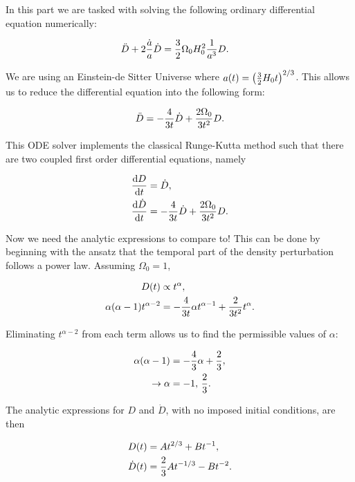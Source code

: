 In this part we are tasked with solving the following ordinary differential equation numerically:

\begin{align}
\ddot{D} + 2{\dot{a} \over a}\dot{D} &= {3\over 2}\Omega_{0}H_{0}^{2}{1\over a^{3}} D.
\end{align}

We are using an Einstein-de Sitter Universe where $a(t) = \left({3\over 2}H_{0}t\right)^{2/3}$. This allows us to reduce the differential equation into the following form:

\begin{align}
\ddot{D} = -{4\over 3t}\dot{D} + {2\Omega_{0} \over 3t^{2}} D.
\end{align}

This ODE solver implements the classical Runge-Kutta method such that there are two coupled first order differential equations, namely

\begin{align}
{{\rm d}D \over {\rm d}t} &= \dot{D}, \\
{{\rm d} \dot{D} \over {\rm d} t} &= -{4\over 3t}\dot{D} + {2\Omega_{0} \over 3t^{2}} D.
\end{align}

Now we need the analytic expressions to compare to! This can be done by beginning with the ansatz that the temporal part of the density perturbation follows a power law. Assuming $\Omega_{0} = 1$,

\begin{align}
D(t) &\propto t^{\alpha}, \\
\alpha(\alpha-1) t^{\alpha-2} &= -{4 \over 3t} \alpha t^{\alpha - 1} + {2 \over 3t^{2}} t^{\alpha}.
\end{align}

Eliminating $t^{\alpha-2}$ from each term allows us to find the permissible values of $\alpha$:

\begin{align}
\alpha(\alpha-1) &= -{4 \over 3} \alpha + {2\over 3}, \\
\to \alpha &= -1, \, {2\over 3}.
\end{align}

The analytic expressions for $D$ and $\dot{D}$, with no imposed initial conditions, are then

\begin{align}
D(t) &= A t^{2/3} + B t^{-1}, \\
\dot{D}(t) &= {2\over 3} A t^{-1/3} - B t^{-2}.
\end{align}

